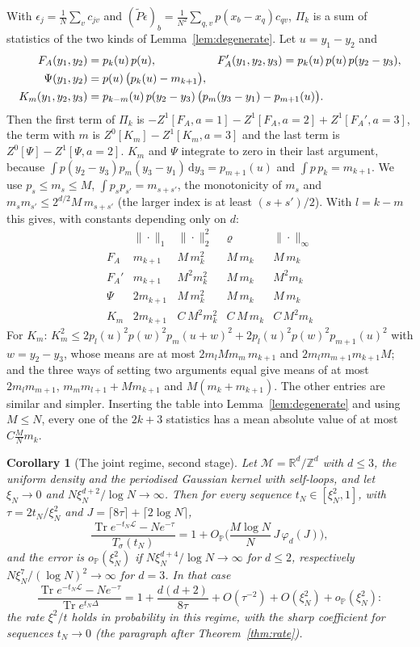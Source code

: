 \documentclass[11pt,a4paper]{article}
\makeatletter
\theoremstyle{stmt}
\newtheorem{corollary}[theorem]{Corollary}
\theoremstyle{defn}
\theoremstyle{rmk}
\renewenvironment{proof}[1][\proofname]{\par\pushQED{\qed}\normalfont\topsep6\p@\@plus6\p@\relax
  \trivlist\item[\hskip\labelsep{\sffamily\itshape\small #1.}]\ignorespaces}{\popQED\endtrivlist\@endpefalse}
\numberwithin{equation}{section}
\DeclareMathOperator{\Tr}{Tr}
\newcommand{\M}{\mathcal{M}}
\newcommand{\Lc}{\mathcal{L}}
\newcommand{\R}{\mathbb{R}}
\newcommand{\dd}{\mathrm{d}}
\makeatother
\begin{document}
{\begin{proof}
With $\epsilon_j=\frac1N\sum_vc_{jv}$ and $(\tilde P\epsilon)_b=\frac1{N^2}\sum_{q,v}p(x_b-x_q)c_{qv}$, $\Pi_k$ is a sum of statistics of the two kinds of Lemma~\ref{lem:degenerate}. Let $u=y_1-y_2$ and
\begin{align*}
F_A(y_1,y_2)&=p_k(u)\,p(u),&F_A'(y_1,y_2,y_3)&=p_k(u)\,p(u)\,p(y_2-y_3),\\
\Psi(y_1,y_2)&=p(u)\,\big(p_k(u)-m_{k+1}\big),\\
K_m(y_1,y_2,y_3)&=\rlap{$p_{k-m}(u)\,p(y_2-y_3)\,\big(p_m(y_3-y_1)-p_{m+1}(u)\big).$}
\end{align*}
Then the first term of $\Pi_k$ is $-Z^1[F_A,a=1]-Z^1[F_A,a=2]+Z^1[F_A',a=3]$, the term with $m$ is $Z^0[K_m]-Z^1[K_m,a=3]$ and the last term is $Z^0[\Psi]-Z^1[\Psi,a=2]$. $K_m$ and $\Psi$ integrate to zero in their last argument, because $\int p(y_2-y_3)p_m(y_3-y_1)\,\dd y_3=p_{m+1}(u)$ and $\int p\,p_k=m_{k+1}$. We use $p_s\le m_s\le M$, $\int p_sp_{s'}=m_{s+s'}$, the monotonicity of $m_s$ and $m_sm_{s'}\le2^{d/2}M\,m_{s+s'}$ (the larger index is at least $(s+s')/2$). With $l=k-m$ this gives, with constants depending only on $d$:
\[
\begin{array}{lllll}
&\|\cdot\|_1&\|\cdot\|_2^2&\varrho&\|\cdot\|_\infty\\\hline
F_A&m_{k+1}&M\,m_k^2&M\,m_k&M\,m_k\\
F_A'&m_{k+1}&M^2m_k^2&M\,m_k&M^2m_k\\
\Psi&2m_{k+1}&M\,m_k^2&M\,m_k&M\,m_k\\
K_m&2m_{k+1}&C\,M^2m_k^2&C\,M\,m_k&C\,M^2m_k
\end{array}
\]
For $K_m$: $K_m^2\le2p_l(u)^2p(w)^2p_m(u+w)^2+2p_l(u)^2p(w)^2p_{m+1}(u)^2$ with $w=y_2-y_3$, whose means are at most $2m_lMm_m\,m_{k+1}$ and $2m_lm_{m+1}m_{k+1}M$; and the three ways of setting two arguments equal give means of at most $2m_lm_{m+1}$, $m_mm_{l+1}+Mm_{k+1}$ and $M(m_k+m_{k+1})$. The other entries are similar and simpler. Inserting the table into Lemma~\ref{lem:degenerate} and using $M\le N$, every one of the $2k+3$ statistics has a mean absolute value of at most $C\frac MNm_k$.
\end{proof}

\begin{corollary}[The joint regime, second stage]\label{cor:secondstage}
Let $\M=\R^d/\mathbb Z^d$ with $d\le3$, the uniform density and the periodised Gaussian kernel with self-loops, and let $\xi_N\to0$ and $N\xi_N^{d+2}/\log N\to\infty$. Then for every sequence $t_N\in[\xi_N^2,1]$, with $\tau=2t_N/\xi_N^2$ and $J=\lceil8\tau\rceil+\lceil2\log N\rceil$,
\[
\frac{\Tr e^{-t_N\Lc}-Ne^{-\tau}}{T_\sigma(t_N)}=1+O_{\mathbb P}\Big(\frac{M\log N}{N}\,J\,\varphi_d(J)\Big),
\]
and the error is $o_{\mathbb P}(\xi_N^2)$ if $N\xi_N^{d+4}/\log N\to\infty$ for $d\le2$, respectively $N\xi_N^{7}/(\log N)^2\to\infty$ for $d=3$. In that case
\[
\frac{\Tr e^{-t_N\Lc}-Ne^{-\tau}}{\Tr e^{t_N\Delta}}=1+\frac{d(d+2)}{8\tau}+O(\tau^{-2})+O(\xi_N^2)+o_{\mathbb P}(\xi_N^2):
\]
the rate $\xi^2/t$ holds in probability in this regime, with the sharp coefficient for sequences $t_N\to0$ (the paragraph after Theorem~\ref{thm:rate}).
\end{corollary}

}
\end{document}
